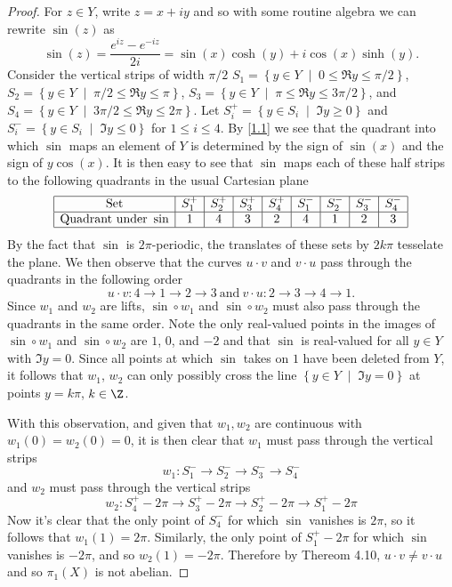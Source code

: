 \documentclass[10pt]{amsart}
\begin{document}
\begin{thm}
\begin{proof}
    For $z \in Y$, write $z = x + iy$ and so with some routine algebra we can rewrite $\sin(z)$ as
    \begin{equation}\label{1.1}
      \sin(z) = \frac{e^{iz} - e^{-iz}}{2i} = \sin(x)\cosh(y) + i\cos(x)\sinh(y).
    \end{equation}
    Consider the vertical strips of width $\pi/2$
    $S_1 = \left\{y \in Y \;\middle\vert\; 0 \leq \Re{y} \leq \pi/2 \right\}$, 
    $S_2 = \left\{y \in Y \;\middle\vert\; \pi/2 \leq \Re{y} \leq \pi \right\}$, 
    $S_3 = \left\{y \in Y \;\middle\vert\; \pi \leq \Re{y} \leq 3\pi/2 \right\}$, and 
    $S_4 = \left\{y \in Y \;\middle\vert\; 3\pi/2 \leq \Re{y} \leq 2\pi \right\}$. 
    Let $S_i^+ = \left\{y \in S_i \;\middle\vert\; \Im{y} \geq 0\right\}$ and $S_i^- = \left\{y \in S_i \;\middle\vert\; \Im{y} \leq 0 \right\}$ for $1 \leq i \leq 4$.
    By \eqref{1.1} we see that the quadrant into which $\sin$ maps an element of $Y$ is determined by the sign of $\sin(x)$ and the sign of $y\cos(x)$.
    It is then easy to see that $\sin$ maps each of these half strips to the following quadrants in the usual Cartesian plane
    $$\begin{array}{|c|c|c|c|c|c|c|c|c|}
      \hline
      \text{Set} & S_1^+ & S_2^+ & S_3^+ & S_4^+ & S_1^- & S_2^- & S_3^- & S_4^-\\
      \hline
      \text{Quadrant under}\ \sin & 1 & 4 & 3 & 2 & 4 & 1 & 2 & 3\\
      \hline
    \end{array}$$
    By the fact that $\sin$ is $2\pi$-periodic, the translates of these sets by $2k\pi$ tesselate the plane.
    We then observe that the curves $u \cdot v$ and $v \cdot u$ pass through the quadrants in the following order
    $$u \cdot v \colon 4 \rightarrow 1 \rightarrow 2 \rightarrow 3\ \text{and}\ v \cdot u \colon 2 \rightarrow 3 \rightarrow 4 \rightarrow 1.$$
    Since $w_1$ and $w_2$ are lifts, $\sin \circ w_1$ and $\sin \circ w_2$ must also pass through the quadrants in the same order.
    Note the only real-valued points in the images of $\sin \circ w_1$ and $\sin \circ w_2$ are $1$, $0$, and $-2$ and that $\sin$ is real-valued for all $y \in Y$ with $\Im{y} = 0$.
    Since all points at which $\sin$ takes on $1$ have been deleted from $Y$, it follows that $w_1$, $w_2$ can only possibly cross the line $\left\{y \in Y \;\middle\vert\; \Im{y} = 0\right\}$ at points $y = k\pi$, $k \in \Z$.
    
    With this observation, and given that $w_1, w_2$ are continuous with $w_1(0) = w_2(0) = 0$, it is then clear that $w_1$ must pass through the vertical strips
    $$w_1 \colon S_1^- \rightarrow S_2^- \rightarrow S_3^- \rightarrow S_4^-$$
    and $w_2$ must pass through the vertical strips
    $$w_2 \colon S_4^+ - 2\pi \rightarrow S_3^+ - 2\pi \rightarrow S_2^+ - 2\pi \rightarrow S_1^+ - 2\pi$$
    Now it's clear that the only point of $S_4^-$ for which $\sin$ vanishes is $2\pi$, so it follows that $w_1(1) = 2\pi$.
    Similarly, the only point of $S_1^+ - 2\pi$ for which $\sin$ vanishes is $-2\pi$, and so $w_2(1) = -2\pi$.
    Therefore by Thereom 4.10, $u \cdot v \neq v \cdot u$ and so $\pi_1(X)$ is not abelian.
  \end{proof}
\end{thm}
\end{document}
